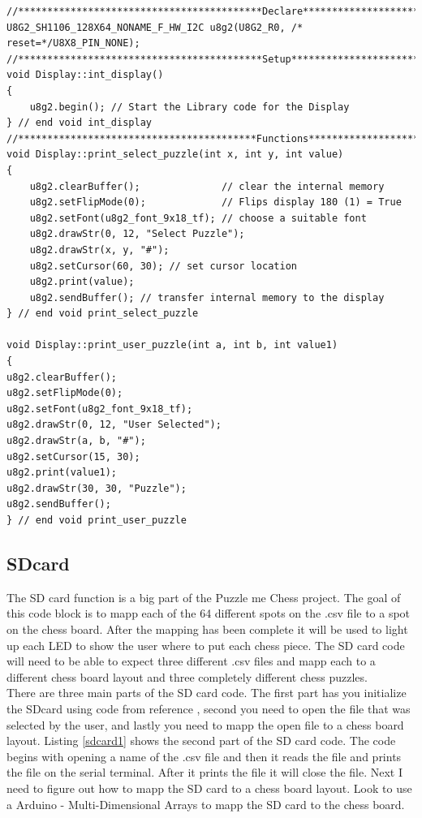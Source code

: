 \documentclass[11pt]{article}
\begin{document}
\begin{lstlisting}[caption={Puzzle me Chess - display.cpp file},label={Display}]
//******************************************Declare*****************************//
U8G2_SH1106_128X64_NONAME_F_HW_I2C u8g2(U8G2_R0, /* reset=*/U8X8_PIN_NONE);
//******************************************Setup******************************//
void Display::int_display()
{
    u8g2.begin(); // Start the Library code for the Display
} // end void int_display
//*****************************************Functions**************************//
void Display::print_select_puzzle(int x, int y, int value)
{   
    u8g2.clearBuffer();              // clear the internal memory
    u8g2.setFlipMode(0);             // Flips display 180 (1) = True
    u8g2.setFont(u8g2_font_9x18_tf); // choose a suitable font
    u8g2.drawStr(0, 12, "Select Puzzle");
    u8g2.drawStr(x, y, "#");
    u8g2.setCursor(60, 30); // set cursor location
    u8g2.print(value);
    u8g2.sendBuffer(); // transfer internal memory to the display
} // end void print_select_puzzle

void Display::print_user_puzzle(int a, int b, int value1)
{
u8g2.clearBuffer();
u8g2.setFlipMode(0);
u8g2.setFont(u8g2_font_9x18_tf); 
u8g2.drawStr(0, 12, "User Selected");
u8g2.drawStr(a, b, "#");
u8g2.setCursor(15, 30); 
u8g2.print(value1);
u8g2.drawStr(30, 30, "Puzzle");
u8g2.sendBuffer();
} // end void print_user_puzzle
\end{lstlisting}

\subsection{SDcard}
The SD card function is a big part of the Puzzle me Chess project. The goal of this code block is to mapp each of the 64 different spots on the .csv file to a spot on the chess board. After the mapping has been complete it will be used to light up each LED to show the user where to put each chess piece. The SD card code will need to be able to expect three different .csv files and mapp each to a different chess board layout and three completely different chess puzzles. 
\\

\noindent There are three main parts of the SD card code. The first part has you initialize the SDcard using code from reference \cite{sdcard}, second you need to open the file that was selected by the user, and lastly you need to mapp the open file to a chess board layout. Listing \ref{sdcard1} shows the second part of the SD card code. The code begins with opening a name of the .csv file and then it reads the file and prints the file on the serial terminal. After it prints the file it will close the file. Next I need to figure out how to mapp the SD card to a chess board layout. Look to use a Arduino - Multi-Dimensional Arrays to mapp the SD card to the chess board. 
\end{document}
